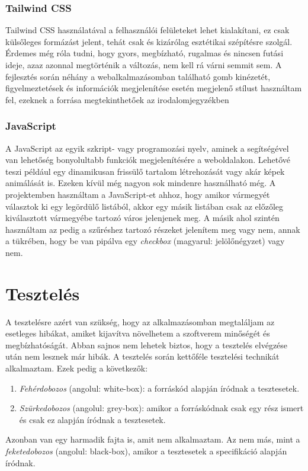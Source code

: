 \documentclass[]{thesis-ekf}
\theoremstyle{definition}
\theoremstyle{remark}
\begin{document}
	\subsection{Tailwind CSS}\label{sc-tailwind}
		Tailwind CSS használatával a felhasználói felületeket lehet kialakítani, ez csak külsőleges formázást jelent, tehát csak és kizárólag esztétikai szépítésre szolgál. Érdemes még róla tudni, hogy gyors, megbízható, rugalmas és nincsen futási ideje, azaz azonnal megtörténik a változás, nem kell rá várni semmit sem. A fejlesztés során néhány a webalkalmazásomban található gomb kinézetét, figyelmeztetések és információk megjelenítése esetén megjelenő stílust használtam fel, ezeknek a forrása megtekinthetőek az irodalomjegyzékben \cite{tailwind, FlowBite}
	\subsection{JavaScript}\label{javascript}
		A JavaScript az egyik szkript- vagy programozási nyelv, aminek a segítségével van lehetőség bonyolultabb funkciók megjelenítésére a weboldalakon. Lehetővé teszi például egy dinamikusan frissülő tartalom létrehozását vagy akár képek animálását is. Ezeken kívül még nagyon sok mindenre használható még. A projektemben használtam a JavaScript-et ahhoz, hogy amikor vármegyét választok ki egy legördülő listából, akkor egy másik listában csak az előzőleg kiválasztott vármegyébe tartozó város jelenjenek meg. A másik ahol szintén használtam az pedig a szűréshez tartozó részeket jelenítem meg vagy nem, annak a tükrében, hogy be van pipálva egy \emph{checkbox} (magyarul: jelölőnégyzet) vagy nem.
		
	\chapter{Tesztelés}
		A tesztelésre azért van szükség, hogy az alkalmazásomban megtaláljam az esetleges hibákat, amiket kijavítva növelhetem a szoftverem minőségét és megbízhatóságát. Abban sajnos nem lehetek biztos, hogy a tesztelés elvégzése után nem lesznek már hibák. A tesztelés során kettőféle tesztelési technikát alkalmaztam. Ezek pedig a következők:
		\begin{enumerate}
			\item \emph{Fehérdobozos} (angolul: white-box): a forráskód alapján íródnak a tesztesetek.
			\item \emph{Szürkedobozos} (angolul: grey-box): amikor a forráskódnak csak egy rész ismert és csak ez alapján íródnak a tesztesetek.
		\end{enumerate}
		Azonban van egy harmadik fajta is, amit nem alkalmaztam. Az nem más, mint a \emph{feketedobozos} (angolul: black-box), amikor a tesztesetek a specifikáció alapján íródnak.
		\cite{Kusper}
\end{document}

